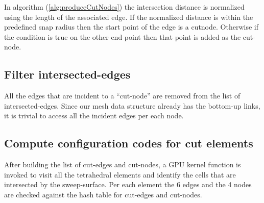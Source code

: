 In algorithm (\ref{alg:produceCutNodes}) the intersection distance is normalized using the length of the associated edge.
If the normalized distance is within the predefined snap radius then the start point of the edge is a cutnode. Otherwise
if the condition is true on the other end point then that point is added as the cut-node.

\subsection{Filter intersected-edges}
All the edges that are incident to a ``cut-node'' are removed from the list of intersected-edges. Since our mesh data structure 
already has the bottom-up links, it is trivial to access all the incident edges per each node. 


\subsection{Compute configuration codes for cut elements}
After building the list of cut-edges and cut-nodes, a GPU kernel function is invoked to visit all the tetrahedral elements and identify 
the cells that are intersected by the sweep-surface. Per each element the 6 edges and the 4 nodes are checked against the hash table for 
cut-edges and cut-nodes. 

